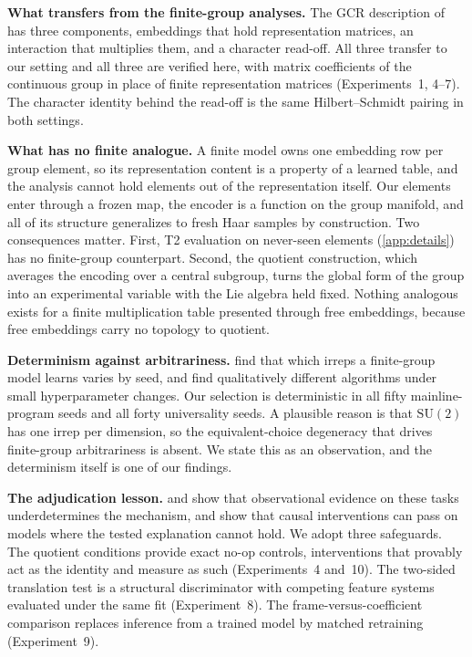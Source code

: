 \documentclass{article}
\newcommand{\SU}{\mathrm{SU}}
\begin{document}
\textbf{What transfers from the finite-group analyses.} The GCR
description of \citet{chughtai2023} has three components, embeddings
that hold representation matrices, an interaction that multiplies them,
and a character read-off. All three transfer to our setting and all
three are verified here, with matrix coefficients of the continuous
group in place of finite representation matrices
(Experiments~1, 4--7). The character identity behind the read-off is
the same Hilbert--Schmidt pairing in both settings.

\textbf{What has no finite analogue.} A finite model owns one embedding
row per group element, so its representation content is a property of a
learned table, and the analysis cannot hold elements out of the
representation itself. Our elements enter through a frozen map, the
encoder is a function on the group manifold, and all of its structure
generalizes to fresh Haar samples by construction. Two consequences
matter. First, T2 evaluation on never-seen elements
(\cref{app:details}) has no finite-group counterpart. Second, the
quotient construction, which averages the encoding over a central
subgroup, turns the global form of the group into an experimental
variable with the Lie algebra held fixed. Nothing analogous exists for
a finite multiplication table presented through free embeddings,
because free embeddings carry no topology to quotient.

\textbf{Determinism against arbitrariness.} \citet{chughtai2023} find
that which irreps a finite-group model learns varies by seed, and
\citet{zhong2023} find qualitatively different algorithms under small
hyperparameter changes. Our selection is deterministic in all fifty
mainline-program seeds and all forty universality seeds. A plausible
reason is that $\SU(2)$ has one irrep per dimension, so the
equivalent-choice degeneracy that drives finite-group arbitrariness is
absent. We state this as an observation, and the determinism itself is
one of our findings.

\textbf{The adjudication lesson.} \citet{stander2024} and
\citet{wu2024} show that observational evidence on these tasks
underdetermines the mechanism, and \citet{wu2024} show that causal
interventions can pass on models where the tested explanation cannot
hold. We adopt three safeguards. The quotient conditions provide exact
no-op controls, interventions that provably act as the identity and
measure as such (Experiments~4 and~10). The two-sided translation test
is a structural discriminator with competing feature systems evaluated
under the same fit (Experiment~8). The frame-versus-coefficient
comparison replaces inference from a trained model by matched
retraining (Experiment~9).
\end{document}
